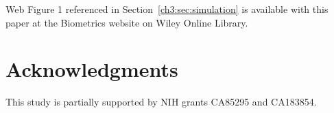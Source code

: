 \documentclass[useAMS,usenatbib,referee]{biom}
\begin{document}
Web Figure 1 referenced in Section~\ref{ch3:sec:simulation} is available
with this paper at the Biometrics website on Wiley Online Library.
\vspace*{-8pt}



\section*{Acknowledgments}

This study is partially supported by NIH grants CA85295 and CA183854.








\label{lastpage}
\end{document}
